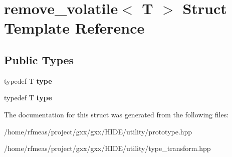 \hypertarget{structremove__volatile}{}\section{remove\+\_\+volatile$<$ T $>$ Struct Template Reference}
\label{structremove__volatile}
\subsection*{Public Types}
\begin{DoxyCompactItemize}
\item 
typedef T {\bfseries type}\hypertarget{structremove__volatile_a77eb8bac386acc2687caab65a52b2745}{}\label{structremove__volatile_a77eb8bac386acc2687caab65a52b2745}

\item 
typedef T {\bfseries type}\hypertarget{structremove__volatile_a77eb8bac386acc2687caab65a52b2745}{}\label{structremove__volatile_a77eb8bac386acc2687caab65a52b2745}

\end{DoxyCompactItemize}


The documentation for this struct was generated from the following files\+:\begin{DoxyCompactItemize}
\item 
/home/rfmeas/project/gxx/gxx/\+H\+I\+D\+E/utility/prototype.\+hpp\item 
/home/rfmeas/project/gxx/gxx/\+H\+I\+D\+E/utility/type\+\_\+transform.\+hpp\end{DoxyCompactItemize}
